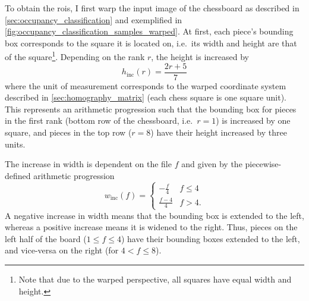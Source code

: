 \documentclass[../report.tex]{subfiles}
\begin{document}
To obtain the \glspl{roi}, I first warp the input image of the chessboard as described in \cref{sec:occupancy_classification} and exemplified in \cref{fig:occupancy_classification_samples_warped}.
At first, each piece's bounding box corresponds to the square it is located on, i.e.\ its width and height are that of the square\footnote{Note that due to the warped perspective, all squares have equal width and height.}.
Depending on the rank $r$, the height is increased by
\begin{equation*}
    h_\text{inc}(r) = \frac{2r + 5}{7}
\end{equation*}
where the unit of measurement corresponds to the warped coordinate system described in \cref{sec:homography_matrix} (each chess square is one square unit).
This represents an arithmetic progression such that the bounding box for pieces in the first rank (bottom row of the chessboard, i.e.\ $r=1$) is increased by one square, and pieces in the top row ($r=8$) have their height increased by three units.

The increase in width is dependent on the file $f$ and given by the piecewise-defined arithmetic progression
\begin{equation*}
    w_\text{inc}(f) = \begin{cases}
        -\frac{f}{4} & f \leq 4 \\
        \frac{f-4}{4} & f > 4.
    \end{cases}
\end{equation*}
A negative increase in width means that the bounding box is extended to the left, whereas a positive increase means it is widened to the right.
Thus, pieces on the left half of the board ($1 \leq f \leq 4$) have their bounding boxes extended to the left, and vice-versa on the right (for $4 < f \leq 8$).
\end{document}

